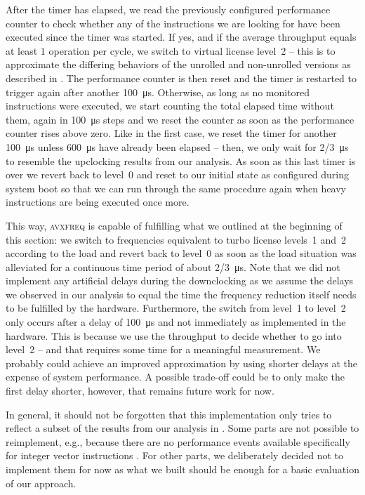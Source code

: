 After the timer has elapsed, we read the previously configured performance counter to check whether any of the instructions we are looking for have been executed since the timer was started. If yes, and if the average throughput equals at least $1$ operation per cycle, we switch to virtual license level~2 -- this is to approximate the differing behaviors of the unrolled and non-unrolled versions as described in . The performance counter is then reset and the timer is restarted to trigger again after another \SI{100}{\micro\second}. Otherwise, as long as no monitored instructions were executed, we start counting the total elapsed time without them, again in \SI{100}{\micro\second} steps and we reset the counter as soon as the performance counter rises above zero. Like in the first case, we reset the timer for another \SI{100}{\micro\second} unless \SI{600}{\micro\second} have already been elapsed -- then, we only wait for \SI[quotient-mode=fraction]{2/3}{\micro\second} to resemble the upclocking results from our analysis. As soon as this last timer is over we revert back to level~0 and reset to our initial state as configured during system boot so that we can run through the same procedure again when heavy instructions are being executed once more.

This way, \textsc{avxfreq} is capable of fulfilling what we outlined at the beginning of this section: we switch to frequencies equivalent to turbo license levels~1 and~2 according to the load and revert back to level~0 as soon as the load situation was alleviated for a continuous time period of about \SI[quotient-mode=fraction]{2/3}{\micro\second}. Note that we did not implement any artificial delays during the downclocking as we assume the delays we observed in our analysis to equal the time the frequency reduction itself needs to be fulfilled by the hardware. Furthermore, the switch from level~1 to level~2 only occurs after a delay of \SI{100}{\micro\second} and not immediately as implemented in the hardware. This is because we use the throughput to decide whether to go into level~2 -- and that requires some time for a meaningful measurement. We probably could achieve an improved approximation by using shorter delays at the expense of system performance. A possible trade-off could be to only make the first delay shorter, however, that remains future work for now.

In general, it should not be forgotten that this implementation only tries to reflect a subset of the results from our analysis in . Some parts are not possible to reimplement, e.g., because there are no performance events available specifically for integer vector instructions \cite{intelsdmsysprogguide}. For other parts, we deliberately decided not to implement them for now as what we built should be enough for a basic evaluation of our approach.

